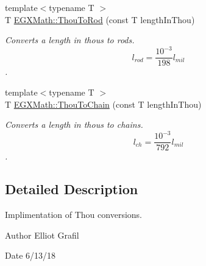 \begin{DoxyCompactItemize}
{\footnotesize template$<$typename T $>$ }\\T \mbox{\hyperlink{group___e_g_x_math-_conversions-_length_conversions-_imperial-_thou-_surveyors_ga904d9983041eecd1dbcc92d29e21d5f3}{E\+G\+X\+Math\+::\+Thou\+To\+Rod}} (const T length\+In\+Thou)
\begin{DoxyCompactList}\small\item\em Converts a length in thous to rods. \[ l_{rod}= \frac{10^{-3}}{198} l_{mil} \]. \end{DoxyCompactList}\item 
{\footnotesize template$<$typename T $>$ }\\T \mbox{\hyperlink{group___e_g_x_math-_conversions-_length_conversions-_imperial-_thou-_surveyors_gafe0134eff7a5cc259ee143f60a4aeec7}{E\+G\+X\+Math\+::\+Thou\+To\+Chain}} (const T length\+In\+Thou)
\begin{DoxyCompactList}\small\item\em Converts a length in thous to chains. \[ l_{ch}= \frac{10^{-3}}{792} l_{mil} \]. \end{DoxyCompactList}\end{DoxyCompactItemize}


\subsection{Detailed Description}
Implimentation of Thou conversions. 

\begin{DoxyAuthor}{Author}
Elliot Grafil 
\end{DoxyAuthor}
\begin{DoxyDate}{Date}
6/13/18 
\end{DoxyDate}
